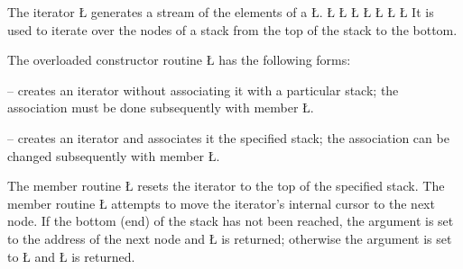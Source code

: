 \documentclass[openright,twoside]{report}
\begin{document}
The iterator \LGinlinetrue\LGbegin\lgrinde\L{}\endlgrinde\LGend{} generates a stream of the elements of a \LGinlinetrue\LGbegin\lgrinde\L{}\endlgrinde\LGend{}.
\LGinlinefalse\LGbegin\lgrinde
\L{}
\L{}
\L{\LB{}}
\L{\LB{}}
\L{\LB{}}
\L{\LB{}}
\L{\LB{\};}}
\endlgrinde\LGend
{}%
%
It is used to iterate over the nodes of a stack from the top of the stack to the bottom.

The overloaded constructor routine \LGinlinetrue\LGbegin\lgrinde\L{}\endlgrinde\LGend{} has the following forms:
\begin{prefix}
\item[\LGinlinetrue\LGbegin\lgrinde\L{\LB{\V{uStackIter}()}}\endlgrinde\LGend{}]
-- creates an iterator without associating it with a particular stack;
the association must be done subsequently with member \LGinlinetrue\LGbegin\lgrinde\L{}\endlgrinde\LGend{}.

\item[\LGinlinetrue\LGbegin\lgrinde\L{\LB{\V{uStackIter}(\0\K{const}\0\V{uStack}\<\V{T}\>\0\&\V{s}\0)}}\endlgrinde\LGend{}]
-- creates an iterator and associates it the specified stack;
the association can be changed subsequently with member \LGinlinetrue\LGbegin\lgrinde\L{}\endlgrinde\LGend{}.
\end{prefix}

The member routine \LGinlinetrue\LGbegin\lgrinde\L{}\endlgrinde\LGend{} resets the iterator to the top of the specified stack.
The member routine \LGinlinetrue\LGbegin\lgrinde\L{\LB{\>\>}}\endlgrinde\LGend{} attempts to move the iterator's internal cursor to the next node.
If the bottom (end) of the stack has not been reached, the argument is set to the address of the next node and \LGinlinetrue\LGbegin\lgrinde\L{}\endlgrinde\LGend{} is returned;
otherwise the argument is set to \LGinlinetrue\LGbegin\lgrinde\L{}\endlgrinde\LGend{} and \LGinlinetrue\LGbegin\lgrinde\L{}\endlgrinde\LGend{} is returned.
\end{document}
